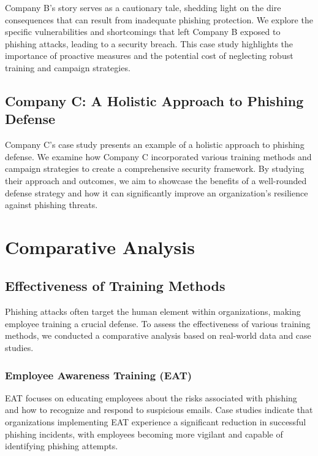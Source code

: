 \documentclass[conference]{IEEEtran}
\begin{document}
Company B's story serves as a cautionary tale, shedding light on the dire consequences that can result from inadequate phishing protection. We explore the specific vulnerabilities and shortcomings that left Company B exposed to phishing attacks, leading to a security breach. This case study highlights the importance of proactive measures and the potential cost of neglecting robust training and campaign strategies.

\subsection{Company C: A Holistic Approach to Phishing Defense}
Company C's case study presents an example of a holistic approach to phishing defense. We examine how Company C incorporated various training methods and campaign strategies to create a comprehensive security framework. By studying their approach and outcomes, we aim to showcase the benefits of a well-rounded defense strategy and how it can significantly improve an organization's resilience against phishing threats.


\section{Comparative Analysis}


\subsection{Effectiveness of Training Methods}

Phishing attacks often target the human element within organizations, making employee training a crucial defense. To assess the effectiveness of various training methods, we conducted a comparative analysis based on real-world data and case studies.

\subsubsection{Employee Awareness Training (EAT)} EAT focuses on educating employees about the risks associated with phishing and how to recognize and respond to suspicious emails. Case studies indicate that organizations implementing EAT experience a significant reduction in successful phishing incidents, with employees becoming more vigilant and capable of identifying phishing attempts.
\end{document}
